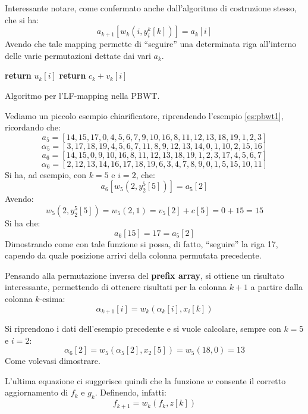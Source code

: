 Interessante notare, come confermato anche dall'algoritmo di costruzione stesso,
che si ha:
\begin{equation}
  \label{eq:pbwt3}
  a_{k+1}\left[w_k\left(i,y_i^k[k]\right)\right]=a_k[i]
\end{equation}
Avendo che tale mapping permette di ``seguire'' una determinata riga
all'interno delle varie permutazioni dettate dai vari $a_k$.
\begin{algorithm}
  \small
  \begin{algorithmic}[1]
    \State \textbf{return} $u_k[i]$
    \Else
    \State \textbf{return} $c_k+v_k[i]$
    \EndIf
    \EndFunction
  \end{algorithmic}
  \caption{Algoritmo per l'LF-mapping nella PBWT.}
  \label{algo:pbwtlf}
\end{algorithm}
\begin{esempio}
  Vediamo un piccolo esempio chiarificatore, riprendendo l'esempio
  \ref{es:pbwt1}, ricordando che:
  \[a_5=[14,15,17,0,4,5,6,7,9,10,16,8,11,12,13,18,19,1,2,3]\]
  \[\alpha_5=[3,17,18,19,4,5,6,7,11,8,9,12,13,14,0,1,10,2,15,16]\]
  \[a_6=[14,15,0,9,10,16,8,11,12,13,18,19,1,2,3,17,4,5,6,7]\]
  \[\alpha_6=[2,12,13,14,16,17,18,19,6,3,4,7,8,9,0,1,5,15,10,11]\]
  Si ha, ad esempio, con $k=5$ e $i=2$, che:
  \[a_{6}\left[w_5\left(2,y_2^5[5]\right)\right]=a_5[2]\]
  Avendo:
  \[w_5\left(2,y_2^5[5]\right)=w_5\left(2,1\right)=v_5[2]+c[5]=0+15=15\]
  Si ha che:
  \[a_{6}[15]=17=a_5[2]\]
  Dimostrando come con tale funzione si possa, di fatto, ``seguire'' la riga 17,
  capendo da quale posizione arrivi della colonna permutata precedente.
\end{esempio}
\noindent
Pensando alla permutazione inversa del \textbf{prefix array}, si
ottiene un risultato interessante, permettendo di ottenere risultati per la
colonna $k+1$ a partire dalla colonna $k$-esima:
\begin{equation}
  \label{eq:pbwtw4}
  \alpha_{k+1}[i]=w_k(\alpha_k[i],x_i[k])
\end{equation}
\begin{esempio}
  Si riprendono i dati dell'esempio precedente e si vuole calcolare, sempre con
  $k=5$ e $i=2$:
  \[\alpha_{6}[2]=w_5(\alpha_5[2],x_2[5])=w_5(18,0)=13\]
  Come volevasi dimostrare.
\end{esempio}
L'ultima equazione ci suggerisce quindi che la funzione $w$
consente il corretto aggiornamento di $f_k$ e $g_k$.
Definendo, infatti:
\begin{equation}
  \label{eq:pbwtq5}
  f_{k+1}=w_k(f_k,z[k])
\end{equation}
